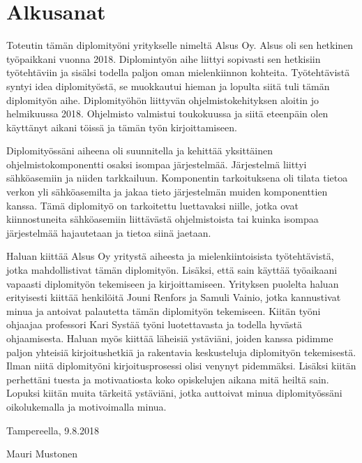 \chapter*{Alkusanat}
\label{ch:alkusanat}
Toteutin tämän diplomityöni yritykselle nimeltä Alsus Oy. Alsus oli sen hetkinen työpaikkani vuonna 2018. Diplomintyön aihe liittyi sopivasti sen hetkisiin työtehtäviin ja sisälsi todella paljon oman mielenkiinnon kohteita. Työtehtävistä syntyi idea diplomityöstä, se muokkautui hieman ja lopulta siitä tuli tämän diplomityön aihe. Diplomityöhön liittyvän ohjelmistokehityksen aloitin jo helmikuussa 2018. Ohjelmisto valmistui toukokuussa ja siitä eteenpäin olen käyttänyt aikani töissä ja tämän työn kirjoittamiseen.

Diplomityössäni aiheena oli suunnitella ja kehittää yksittäinen ohjelmistokomponentti osaksi isompaa järjestelmää. Järjestelmä liittyi sähköasemiin ja niiden tarkkailuun. Komponentin tarkoituksena oli tilata tietoa verkon yli sähköasemilta ja jakaa tieto järjestelmän muiden komponenttien kanssa. Tämä diplomityö on tarkoitettu luettavaksi niille, jotka ovat kiinnostuneita sähköasemiin liittävästä ohjelmistoista tai kuinka isompaa järjestelmää hajautetaan ja tietoa siinä jaetaan.

Haluan kiittää Alsus Oy yritystä aiheesta ja mielenkiintoisista työtehtävistä, jotka mahdollistivat tämän diplomityön. Lisäksi, että sain käyttää työaikaani vapaasti diplomityön tekemiseen ja kirjoittamiseen. Yrityksen puolelta haluan erityisesti kiittää henkilöitä Jouni Renfors ja Samuli Vainio, jotka kannustivat minua ja antoivat palautetta tämän diplomityön tekemiseen. Kiitän työni ohjaajaa professori Kari Systää työni luotettavasta ja todella hyvästä ohjaamisesta. Haluan myös kiittää läheisiä ystäviäni, joiden kanssa pidimme paljon yhteisiä kirjoitushetkiä ja rakentavia keskusteluja diplomityön tekemisestä. Ilman niitä diplomityöni kirjoitusprosessi olisi venynyt pidemmäksi. Lisäksi kiitän perhettäni tuesta ja motivaatiosta koko opiskelujen aikana mitä heiltä sain. Lopuksi kiitän muita tärkeitä ystäviäni, jotka auttoivat minua diplomityössäni oikolukemalla ja motivoimalla minua.

\vspace{2\baselineskip}

Tampereella, 9.8.2018

\vspace{2\baselineskip}

Mauri Mustonen
